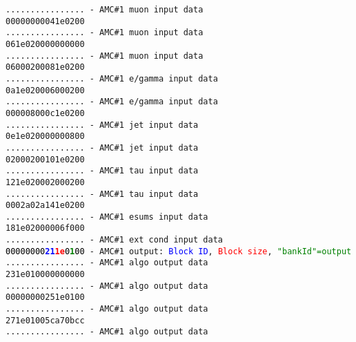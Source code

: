 \texttt{................ - AMC\#1 muon input data}\\
\texttt{00000000041e0200}\\
\texttt{................ - AMC\#1 muon input data}\\
\texttt{061e020000000000}\\
\texttt{................ - AMC\#1 muon input data}\\
\texttt{06000200081e0200}\\
\texttt{................ - AMC\#1 e/gamma input data}\\
\texttt{0a1e020006000200}\\
\texttt{................ - AMC\#1 e/gamma input data}\\
\texttt{000008000c1e0200}\\
\texttt{................ - AMC\#1 jet input data}\\
\texttt{0e1e020000000800}\\
\texttt{................ - AMC\#1 jet input data}\\
\texttt{02000200101e0200}\\
\texttt{................ - AMC\#1 tau input data}\\
\texttt{121e020002000200}\\
\texttt{................ - AMC\#1 tau input data}\\
\texttt{0002a02a141e0200}\\
\texttt{................ - AMC\#1 esums input data}\\
\texttt{181e02000006f000}\\
\texttt{................ - AMC\#1 ext cond input data}\\
\texttt{\textcolor{black}{00000000}\textcolor{blue}{\textbf{21}}\textcolor{red}{\textbf{1e}}\textcolor{black}{0}\textcolor{green}{\textbf{1}}\textcolor{black}{00} - AMC\#1 output: \textcolor{blue}{Block ID}, \textcolor{red}{Block size}, \textcolor{green}{"bankId"=output}}\\
\texttt{................ - AMC\#1 algo output data}\\
\texttt{231e010000000000}\\
\texttt{................ - AMC\#1 algo output data}\\
\texttt{00000000251e0100}\\
\texttt{................ - AMC\#1 algo output data}\\
\texttt{271e01005ca70bcc}\\
\texttt{................ - AMC\#1 algo output data}\\
